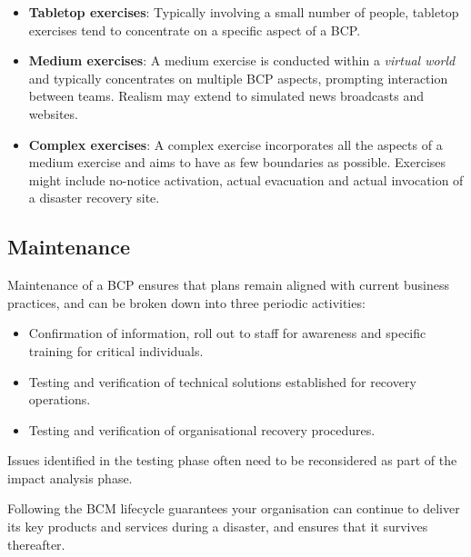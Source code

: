 \documentclass[a4paper,12pt]{article}
\begin{document}
\begin{itemize}
\item \textbf{Tabletop exercises}: Typically involving a small number of people, tabletop exercises tend to concentrate on a specific aspect of a BCP.
\item \textbf{Medium exercises}: A medium exercise is conducted within a \emph{virtual world} and typically concentrates on multiple BCP aspects, prompting interaction between teams. Realism may extend to simulated news broadcasts and websites.
\item \textbf{Complex exercises}: A complex exercise incorporates all the aspects of a medium exercise and aims to have as few boundaries as possible. Exercises might include no-notice activation, actual evacuation and actual invocation of a disaster recovery site.
\end{itemize}

\subsection{Maintenance}
Maintenance of a BCP ensures that plans remain aligned with current business practices, and can be broken down into three periodic activities:

\begin{itemize}
\item Confirmation of information, roll out to staff for awareness and specific training for critical individuals.
\item Testing and verification of technical solutions established for recovery operations.
\item Testing and verification of organisational recovery procedures.
\end{itemize}
Issues identified in the testing phase often need to be reconsidered as part of the impact analysis phase.

Following the BCM lifecycle guarantees your organisation can continue to deliver its key products and services during a disaster, and ensures that it survives thereafter.
\end{document}
